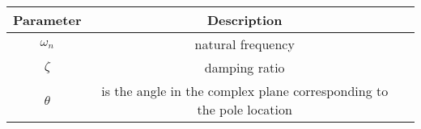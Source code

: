 \begin{tabular}{|c|c|c|}
	\hline
	\textbf{Parameter} &  \textbf{Description}\\[6pt]
	\hline
	$\omega_{n}$ & natural frequency\\[6pt]
	\hline
	$\zeta$ & damping ratio \\[6pt]
	\hline 
	$\theta$ & is the angle in the complex plane corresponding to the pole location\\[6pt]
	\hline
\end{tabular}
